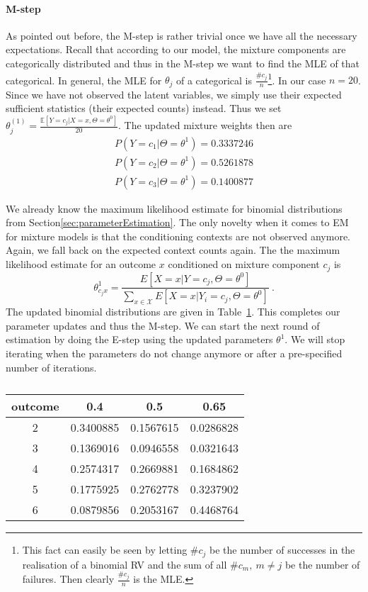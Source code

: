 \documentclass[a4paper,11pt,leqno]{report}\usepackage[]{graphicx}\usepackage[]{color}
\newenvironment{knitrout}{}{} %
\newcommand{\E}{\mathbb{E}}
\begin{document}
\paragraph{M-step} As pointed out before, the M-step is rather trivial once we have all the necessary expectations. Recall that according to our model, 
the mixture components are categorically
distributed and thus in the M-step we want to find the MLE of that categorical. In general, the MLE for $ \theta_{j} $ of a categorical is
$ \frac{\#c_{j}}{n} $\footnote{This fact can easily be seen by letting $ \#c_{j} $ be the number of successes in the realisation of a binomial RV and the sum of all
$ \#c_{m},~m \not = j $ be the number of failures. Then clearly $ \frac{\#c_{j}}{n} $ is the MLE.}. In our case $ n=20 $. Since we have not observed the
latent variables, we simply use their expected sufficient statistics (their expected counts) instead. Thus we set 
$ \theta_{j}^{(1)} = \frac{\E[Y = c_{j}|X=x,\Theta= \theta^{0}]}{20} $. The updated mixture weights then are 
\begin{align}
P(Y=c_{1}|\Theta= \theta^{1}) = 0.3337246 \\
P(Y=c_{2}|\Theta= \theta^{1}) = 0.5261878 \nonumber \\
P(Y=c_{3}|\Theta= \theta^{1}) = 0.1400877 \nonumber
\end{align}

We already know the maximum likelihood estimate for binomial distributions from 
Section\ref{sec:parameterEstimation}. The only novelty when it comes to EM for mixture models
is that the conditioning contexts are not observed anymore. Again, we fall back on the expected
context counts again. The the maximum likelihood estimate for an outcome $ x $ conditioned on
mixture component $ c_{j} $ is
$$ \theta_{c_{j}x}^{1} = \frac{E[X=x|Y=c_{j},\Theta=\theta^{0}]}{\sum_{x \in \mathcal{X}}E[X=x|Y_{i}=c_{j},\Theta=\theta^{0}]}\ . $$
The updated binomial distributions are given in Table~\ref{tab:newBinoms}. This completes our parameter
updates and thus the M-step. We can start the next round of estimation by doing the E-step using the
updated parameters $ \theta^{1} $. We will stop iterating when the parameters do not change anymore or
after a pre-specified number of iterations.

\begin{table}
\center
\begin{knitrout}
\color{fgcolor}
\begin{tabular}{c|c|c|c}
\hline
outcome & 0.4 & 0.5 & 0.65\\
\hline
2 & 0.3400885 & 0.1567615 & 0.0286828\\
\hline
3 & 0.1369016 & 0.0946558 & 0.0321643\\
\hline
4 & 0.2574317 & 0.2669881 & 0.1684862\\
\hline
5 & 0.1775925 & 0.2762778 & 0.3237902\\
\hline
6 & 0.0879856 & 0.2053167 & 0.4468764\\
\hline
\end{tabular}


\end{knitrout}
\caption{}
\label{tab:newBinoms}
\end{table}
\end{document}
